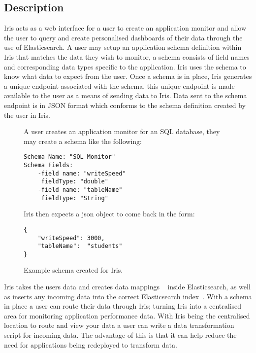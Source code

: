 \documentclass[12pt,a4paper,titlepage]{report}
\begin{document}
\subsection{Description}
Iris acts as a web interface for a user to create an application monitor and allow the user to query and create personalised dashboards of their data through the use of Elasticsearch. A user may setup an application schema definition within Iris that matches the data they wish to monitor, a schema consists of field names and corresponding data types specific to the application. Iris uses the schema to know what data to expect from the user. Once a schema is in place, Iris generates a unique endpoint associated with the schema, this unique endpoint is made available to the user as a means of sending data to Iris. Data sent to the schema endpoint is in JSON format which conforms to the schema definition created by the user in Iris.
\begin{figure}[H]
\begin{tcolorbox}
A user creates an application monitor for an SQL database, they may create a schema like the following:
\begin{verbatim}
Schema Name: "SQL Monitor"
Schema Fields:
    -field name: "writeSpeed"
     fieldType: "double"
    -field name: "tableName"
     fieldType: "String"
\end{verbatim}
Iris then expects a json object to come back in the form:
\begin{verbatim}
{
	"writeSpeed": 3000,
	"tableName":  "students"
}
\end{verbatim}
\end{tcolorbox}
\caption{Example schema created for Iris.}
\end{figure}

Iris takes the users data and creates data mappings ~\parencite{Elastic.co.Mapping} inside Elasticsearch, as well as inserts any incoming data into the correct Elasticsearch index~\parencite{Elastic.co.Basic}. With a schema in place a user can route their data through Iris; turning Iris into a centralised area for monitoring application performance data. With Iris being the centralised location to route and view your data a user can write a data transformation script for incoming data. The advantage of this is that it can help reduce the need for applications being redeployed to transform data.
\end{document}
